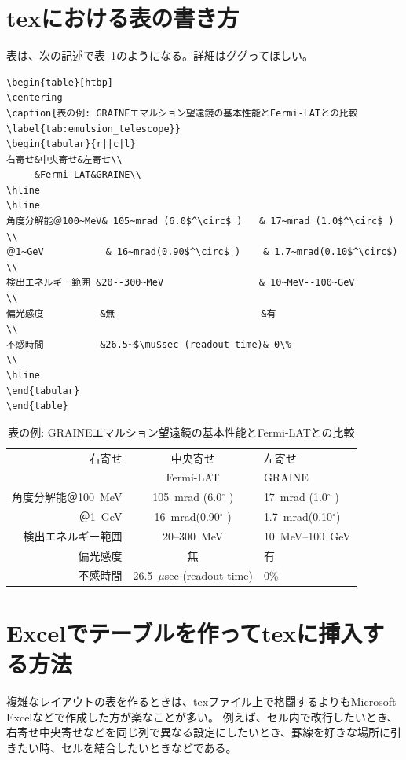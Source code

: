 \documentclass[a4j,openany,11px]{jsbook}
\begin{document}
\section{texにおける表の書き方}
表は、次の記述で表~\ref{tab:emulsion_telescope}のようになる。詳細はググってほしい。
\begin{verbatim}
\begin{table}[htbp]
\centering
\caption{表の例: GRAINEエマルション望遠鏡の基本性能とFermi-LATとの比較\label{tab:emulsion_telescope}}
\begin{tabular}{r||c|l}
右寄せ&中央寄せ&左寄せ\\
     &Fermi-LAT&GRAINE\\
\hline
\hline
角度分解能＠100~MeV& 105~mrad (6.0$^\circ$ )   & 17~mrad (1.0$^\circ$ ) \\
＠1~GeV           & 16~mrad(0.90$^\circ$ )    & 1.7~mrad(0.10$^\circ$) \\
検出エネルギー範囲 &20--300~MeV                 & 10~MeV--100~GeV        \\
偏光感度          &無                          &有                      \\
不感時間          &26.5~$\mu$sec (readout time)& 0\%                    \\
\hline
\end{tabular}
\end{table}
\end{verbatim}
\begin{table}[htbp]
\centering
\caption{表の例: GRAINEエマルション望遠鏡の基本性能とFermi-LATとの比較\label{tab:emulsion_telescope}}
\begin{tabular}{r||c|l}
右寄せ&中央寄せ&左寄せ\\
     &Fermi-LAT&GRAINE\\
\hline
\hline
角度分解能＠100~MeV& 105~mrad (6.0$^\circ$ )   & 17~mrad (1.0$^\circ$ ) \\
＠1~GeV           & 16~mrad(0.90$^\circ$ )    & 1.7~mrad(0.10$^\circ$) \\
検出エネルギー範囲 &20--300~MeV                 & 10~MeV--100~GeV        \\
偏光感度          &無                          &有                      \\
不感時間          &26.5~$\mu$sec (readout time)& 0\%                    \\
\hline
\end{tabular}
\end{table}

\section{Excelでテーブルを作ってtexに挿入する方法}
複雑なレイアウトの表を作るときは、texファイル上で格闘するよりもMicrosoft Excelなどで作成した方が楽なことが多い。
例えば、セル内で改行したいとき、右寄せ中央寄せなどを同じ列で異なる設定にしたいとき、罫線を好きな場所に引きたい時、セルを結合したいときなどである。
\end{document}
